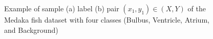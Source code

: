 \begin{figure}[H]%
    \centering
    \caption[Sample label pair]{Example of sample (a) label (b) pair $(x_1,y_1)\in (X,Y)$ of the Medaka fish dataset with four classes (Bulbus, Ventricle, Atrium, and Background)}
    \label{sample_label_pair}
\end{figure}

